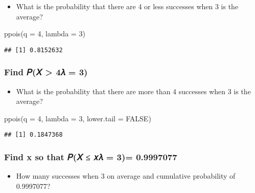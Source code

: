 \documentclass[
  12pt,
]{article}
\newenvironment{Shaded}{\begin{snugshade}}{\end{snugshade}}
\newcommand{\AttributeTok}[1]{\textcolor[rgb]{0.77,0.63,0.00}{#1}}
\newcommand{\ConstantTok}[1]{\textcolor[rgb]{0.00,0.00,0.00}{#1}}
\newcommand{\DecValTok}[1]{\textcolor[rgb]{0.00,0.00,0.81}{#1}}
\newcommand{\FunctionTok}[1]{\textcolor[rgb]{0.00,0.00,0.00}{#1}}
\newcommand{\NormalTok}[1]{#1}
\providecommand{\tightlist}{%
  \setlength{\itemsep}{0pt}\setlength{\parskip}{0pt}}
\begin{document}
\begin{itemize}
\tightlist
\item
  What is the probability that there are 4 or less successes when 3 is
  the average?
\end{itemize}

\begin{Shaded}
\begin{Highlighting}[]
\FunctionTok{ppois}\NormalTok{(}\AttributeTok{q =} \DecValTok{4}\NormalTok{, }\AttributeTok{lambda =} \DecValTok{3}\NormalTok{)}
\end{Highlighting}
\end{Shaded}

\begin{verbatim}
## [1] 0.8152632
\end{verbatim}

\hypertarget{find-ux1d443ux1d44b-4ux1d706-3-2}{%
\subsubsection{Find 𝑃(𝑋 \textgreater{} 4\textbar 𝜆 =
3)}\label{find-ux1d443ux1d44b-4ux1d706-3-2}}

\begin{itemize}
\tightlist
\item
  What is the probability that there are more than 4 successes when 3 is
  the average?
\end{itemize}

\begin{Shaded}
\begin{Highlighting}[]
\FunctionTok{ppois}\NormalTok{(}\AttributeTok{q =} \DecValTok{4}\NormalTok{, }\AttributeTok{lambda =} \DecValTok{3}\NormalTok{, }\AttributeTok{lower.tail =} \ConstantTok{FALSE}\NormalTok{)}
\end{Highlighting}
\end{Shaded}

\begin{verbatim}
## [1] 0.1847368
\end{verbatim}

\hypertarget{find-x-so-that-ux1d443ux1d44b-ux1d465ux1d706-3-0.9997077}{%
\subsubsection{Find x so that 𝑃(𝑋 ≤ 𝑥\textbar 𝜆 = 3)=
0.9997077}\label{find-x-so-that-ux1d443ux1d44b-ux1d465ux1d706-3-0.9997077}}

\begin{itemize}
\tightlist
\item
  How many successes when 3 on average and cumulative probability of
  0.9997077?
\end{itemize}
\end{document}
